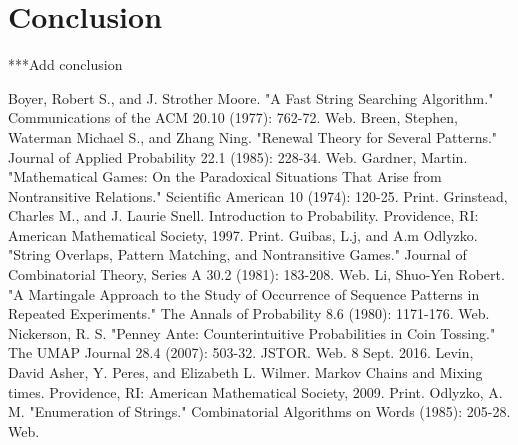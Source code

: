 \documentclass{article}
\numberwithin{mytheorem}{subsection} %
\begin{document}
	\section{Conclusion}
		***Add conclusion 

	\begin{thebibliography}{1}
			Boyer, Robert S., and J. Strother Moore. "A Fast String Searching Algorithm." Communications of the ACM 20.10 (1977): 762-72. Web. 
			Breen, Stephen, Waterman Michael S., and Zhang Ning. "Renewal Theory for Several Patterns." Journal of Applied Probability 22.1 (1985): 228-34. Web.
			Gardner, Martin. "Mathematical Games: On the Paradoxical Situations That Arise from Nontransitive Relations." Scientific American 10 (1974): 120-25. Print.
 			Grinstead, Charles M., and J. Laurie Snell. Introduction to Probability. Providence, RI: American Mathematical Society, 1997. Print. 
			Guibas, L.j, and A.m Odlyzko. "String Overlaps, Pattern Matching, and Nontransitive Games." Journal of Combinatorial Theory, Series A 30.2 (1981): 183-208. Web.
			Li, Shuo-Yen Robert. "A Martingale Approach to the Study of Occurrence of Sequence Patterns in Repeated Experiments." The Annals of Probability 8.6 (1980): 1171-176. Web.
			Nickerson, R. S. "Penney Ante: Counterintuitive Probabilities in Coin Tossing." The UMAP Journal 28.4 (2007): 503-32. JSTOR. Web. 8 Sept. 2016. 
			Levin, David Asher, Y. Peres, and Elizabeth L. Wilmer. Markov Chains and Mixing times. Providence, RI: American Mathematical Society, 2009. Print. 
			Odlyzko, A. M. "Enumeration of Strings." Combinatorial Algorithms on Words (1985): 205-28. Web.
			
	\end{thebibliography}
\end{document}
